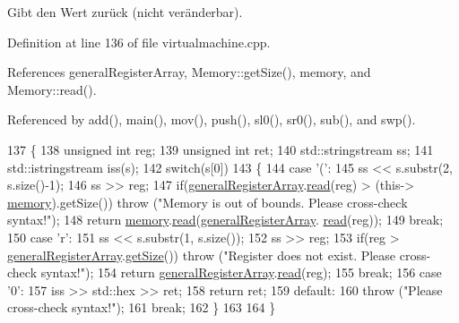 Gibt den Wert zurück (nicht veränderbar). 

Definition at line 136 of file virtualmachine.\+cpp.



References general\+Register\+Array, Memory\+::get\+Size(), memory, and Memory\+::read().



Referenced by add(), main(), mov(), push(), sl0(), sr0(), sub(), and swp().


\begin{DoxyCode}
137 \{
138     \textcolor{keywordtype}{unsigned} \textcolor{keywordtype}{int} reg;
139     \textcolor{keywordtype}{unsigned} \textcolor{keywordtype}{int} ret;
140     std::stringstream ss;
141     std::istringstream iss(s);
142     \textcolor{keywordflow}{switch}(s[0])
143     \{
144         \textcolor{keywordflow}{case} \textcolor{charliteral}{'('}:
145             ss << s.substr(2, s.size()-1);
146             ss >> reg;
147             \textcolor{keywordflow}{if}(\mbox{\hyperlink{class_virtual_machine_aae855da52e8f3b0a167b8fec497d44d9}{generalRegisterArray}}.\mbox{\hyperlink{class_memory_ab669beeca09308c880af9b13cde7f655}{read}}(reg) > (this->
      \mbox{\hyperlink{class_virtual_machine_a54136a9c003e36e77c28f31c7bef2dc2}{memory}}).getSize()) \textcolor{keywordflow}{throw} (\textcolor{stringliteral}{"Memory is out of bounds. Please cross-check syntax!"});
148             \textcolor{keywordflow}{return} \mbox{\hyperlink{class_virtual_machine_a54136a9c003e36e77c28f31c7bef2dc2}{memory}}.\mbox{\hyperlink{class_memory_ab669beeca09308c880af9b13cde7f655}{read}}(\mbox{\hyperlink{class_virtual_machine_aae855da52e8f3b0a167b8fec497d44d9}{generalRegisterArray}}.
      \mbox{\hyperlink{class_memory_ab669beeca09308c880af9b13cde7f655}{read}}(reg));
149             \textcolor{keywordflow}{break};
150         \textcolor{keywordflow}{case} \textcolor{charliteral}{'r'}:
151             ss << s.substr(1, s.size());
152             ss >> reg;
153             \textcolor{keywordflow}{if}(reg > \mbox{\hyperlink{class_virtual_machine_aae855da52e8f3b0a167b8fec497d44d9}{generalRegisterArray}}.\mbox{\hyperlink{class_memory_a9687fde54e7c10c54060117045060613}{getSize}}()) \textcolor{keywordflow}{throw} (\textcolor{stringliteral}{"Register does not
       exist. Please cross-check syntax!"});
154             \textcolor{keywordflow}{return} \mbox{\hyperlink{class_virtual_machine_aae855da52e8f3b0a167b8fec497d44d9}{generalRegisterArray}}.\mbox{\hyperlink{class_memory_ab669beeca09308c880af9b13cde7f655}{read}}(reg);
155             \textcolor{keywordflow}{break};
156         \textcolor{keywordflow}{case} \textcolor{charliteral}{'0'}:
157             iss >> std::hex >> ret;
158             \textcolor{keywordflow}{return} ret;
159         \textcolor{keywordflow}{default}:
160             \textcolor{keywordflow}{throw} (\textcolor{stringliteral}{"Please cross-check syntax!"});
161             \textcolor{keywordflow}{break};
162     \}
163 
164 \}
\end{DoxyCode}
